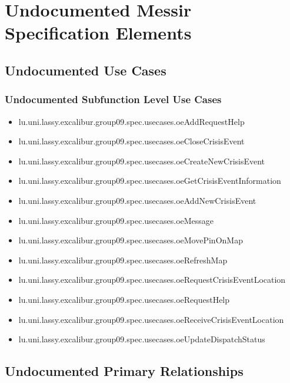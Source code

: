 	
\chapter{Undocumented Messir Specification Elements}


\section[Undocumented Use Cases]{Undocumented Use Cases}



\subsection[Undocumented Use Cases - Subfunction Level]{Undocumented Subfunction Level Use Cases}
\begin{itemize}
\item lu.uni.lassy.excalibur.group09.spec.usecases.oeAddRequestHelp 
\item lu.uni.lassy.excalibur.group09.spec.usecases.oeCloseCrisisEvent 
\item lu.uni.lassy.excalibur.group09.spec.usecases.oeCreateNewCrisisEvent 
\item lu.uni.lassy.excalibur.group09.spec.usecases.oeGetCrisisEventInformation 
\item lu.uni.lassy.excalibur.group09.spec.usecases.oeAddNewCrisisEvent 
\item lu.uni.lassy.excalibur.group09.spec.usecases.oeMessage 
\item lu.uni.lassy.excalibur.group09.spec.usecases.oeMovePinOnMap 
\item lu.uni.lassy.excalibur.group09.spec.usecases.oeRefreshMap 
\item lu.uni.lassy.excalibur.group09.spec.usecases.oeRequestCrisisEventLocation 
\item lu.uni.lassy.excalibur.group09.spec.usecases.oeRequestHelp 
\item lu.uni.lassy.excalibur.group09.spec.usecases.oeReceiveCrisisEventLocation 
\item lu.uni.lassy.excalibur.group09.spec.usecases.oeUpdateDispatchStatus 
\end{itemize}














\section[Undocumented Primary Type Relationships]{Undocumented Primary Relationships}


